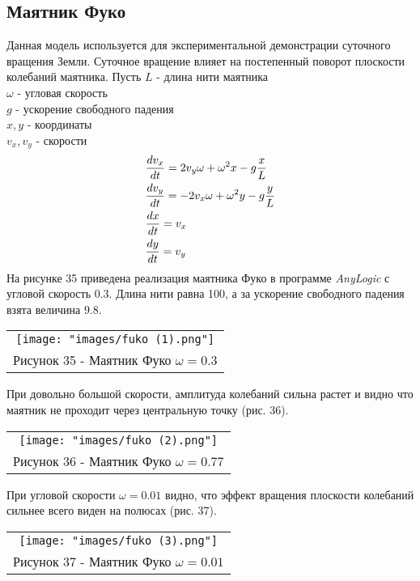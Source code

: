 \subsection{Маятник Фуко}
Данная модель используется для экспериментальной демонстрации суточного вращения Земли. Суточное вращение влияет на постепенный поворот плоскости колебаний маятника.
Пусть $L$ - длина нити маятника\\
$\omega$ - угловая скорость\\
$g$ - ускорение свободного падения\\
$x,y$ - координаты\\
$v_x, v_y$ - скорости
\begin{align}
  &\dfrac{d v_x}{dt} = 2v_y\omega+\omega^2x-g\dfrac{x}{L}\notag\\
  &\dfrac{d v_y}{dt} = -2v_x\omega+\omega^2y-g\dfrac{y}{L}\\
  &\dfrac{d x}{dt} = v_x\notag\\
  &\dfrac{d y}{dt} = v_y\notag
\end{align}
На рисунке 35 приведена реализация маятника Фуко в программе \textit{AnyLogic} с угловой скорость 0.3. Длина нити равна 100, а за ускорение свободного падения взята величина $9.8$.
\begin{center}
  \begin{tabular}{c}
  \texttt{[image: "images/fuko (1).png"]}\\
  Рисунок 35 - Маятник Фуко $\omega=0.3$
\end{tabular}
\end{center}
При довольно большой скорости, амплитуда колебаний сильна растет и видно что маятник не проходит через центральную точку (рис. 36).
\begin{center}
  \begin{tabular}{c}
  \texttt{[image: "images/fuko (2).png"]}\\
  Рисунок 36 - Маятник Фуко $\omega=0.77$
\end{tabular}
\end{center}
При угловой скорости $\omega=0.01$ видно, что эффект вращения плоскости колебаний сильнее всего виден на полюсах (рис. 37).
\begin{center}
  \begin{tabular}{c}
  \texttt{[image: "images/fuko (3).png"]}\\
  Рисунок 37 - Маятник Фуко $\omega=0.01$
\end{tabular}
\end{center}

